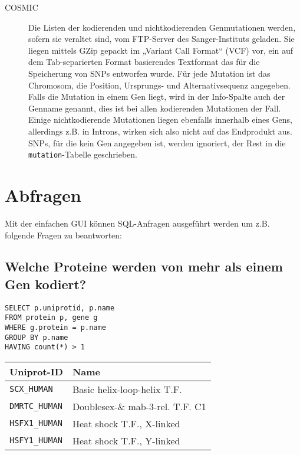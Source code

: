 \documentclass{scrartcl}
\begin{document}
\begin{description}
\item[COSMIC]
Die Listen der kodierenden und nichtkodierenden Genmutationen werden, sofern sie veraltet sind, vom FTP-Server des Sanger-Instituts geladen. Sie liegen mittels GZip gepackt im „Variant Call Format“ (VCF) vor, ein auf dem Tab-separierten Format basierendes Textformat das für die Speicherung von SNPs entworfen wurde. Für jede Mutation ist das Chromosom, die Position, Ursprungs- und Alternativsequenz angegeben. Falls die Mutation in einem Gen liegt, wird in der Info-Spalte auch der Genname genannt, dies ist bei allen kodierenden Mutationen der Fall. Einige nichtkodierende Mutationen liegen ebenfalls innerhalb eines Gens, allerdings z.B. in Introns, wirken sich also nicht auf das Endprodukt aus. SNPs, für die kein Gen angegeben ist, werden ignoriert, der Rest in die \texttt{mutation}-Tabelle geschrieben.
\end{description}

\section{Abfragen}

Mit der einfachen GUI können SQL-Anfragen ausgeführt werden um z.B. folgende Fragen zu beantworten:

\subsection{Welche Proteine werden von mehr als einem Gen kodiert?}

\noindent\begin{minipage}{.4\hsize}
\begin{verbatim}
SELECT p.uniprotid, p.name
FROM protein p, gene g 
WHERE g.protein = p.name
GROUP BY p.name 
HAVING count(*) > 1
\end{verbatim}
\end{minipage}
\begin{minipage}{.6\hsize}
\hfill\begin{tabular}{ll}
\toprule
Uniprot-ID & Name\\
\midrule
\verb|SCX_HUMAN| &Basic helix-loop-helix T.F.\\
\verb|DMRTC_HUMAN|&Doublesex-\& mab-3-rel. T.F. C1\\
\verb|HSFX1_HUMAN|&Heat shock T.F., X-linked\\
\verb|HSFY1_HUMAN|&Heat shock T.F., Y-linked\\
\bottomrule
\end{tabular}
\end{minipage}
\end{document}
